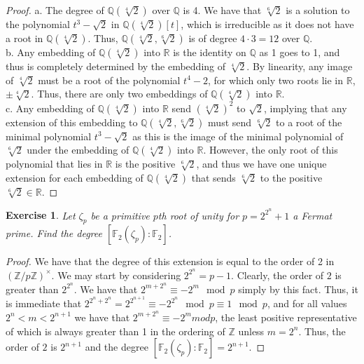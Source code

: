 \documentclass{article}
\newtheorem{exercise}{Exercise}
\begin{document}
\begin{proof}
  a. The degree of $\mathbb{Q}(\sqrt[4]{2})$ over $\mathbb{Q}$ is 4. We have that $\sqrt[6]{2}$ is a solution to the polynomial $t^{3} - \sqrt{2}$ in $\mathbb{Q}(\sqrt[4]{2})[t]$, which is irreducible as it does not have a root in $\mathbb{Q}(\sqrt[4]{2})$. Thus, $\mathbb{Q}(\sqrt[4]{2}, \sqrt[6]{2})$ is of degree $4 \cdot 3 = 12$ over $\mathbb{Q}$. \\
  b. Any embedding of $\mathbb{Q}(\sqrt[4]{2})$ into $\mathbb{R}$ is the identity on $\mathbb{Q}$ as 1 goes to 1, and thus is completely determined by the embedding of $\sqrt[4]{2}$. By linearity, any image of $\sqrt[4]{2}$ must be a root of the polynomial $t^{4} - 2$, for which only two roots lie in $\mathbb{R}$, $\pm \sqrt[4]{2}$. Thus, there are only two embeddings of $\mathbb{Q}(\sqrt[4]{2})$ into $\mathbb{R}$. \\
c. Any embedding of $\mathbb{Q}(\sqrt[4]{2})$ into $\mathbb{R}$ send $(\sqrt[4]{2})^{2}$ to $\sqrt{2}$, implying that any extension of this embedding to $\mathbb{Q}(\sqrt[4]{2}, \sqrt[6]{2})$ must send $\sqrt[6]{2}$ to a root of the minimal polynomial $t^{3} - \sqrt{2}$ as this is the image of the minimal polynomial of $\sqrt[6]{2}$ under the embedding of $\mathbb{Q}(\sqrt[4]{2})$ into $\mathbb{R}$. However, the only root of this polynomial that lies in $\mathbb{R}$ is the positive $\sqrt[6]{2}$, and thus we have one unique extension for each embedding of $\mathbb{Q}(\sqrt[4]{2})$ that sends $\sqrt[6]{2}$ to the positive $\sqrt[6]{2}\in \mathbb{R}$. 
\end{proof}

\begin{exercise}
  Let $\zeta_{p}$ be a primitive $p$th root of unity for $p = 2^{2^{n}}+1$ a Fermat prime. Find the degree $[\mathbb{F}_{2}(\zeta_{p}):\mathbb{F}_{2}]$.
\end{exercise}

\begin{proof}
  We have that the degree of this extension is equal to the order of 2 in $(\mathbb{Z}/p\mathbb{Z})^{\times}$. We may start by considering $2^{2^{n}} = p-1$. Clearly, the order of $2$ is greater than $2^{2^{n}}$. We have that $2^{m+2^{n}}\equiv -2^{m} \mod p$ simply by this fact. Thus, it is immediate that $2^{2^{n}+2^{n}} = 2^{2^{n+1}} \equiv -2^{2^{n}} \mod p \equiv 1 \mod p$, and for all values $2^{n}< m <2^{n+1}$ we have that $2^{m+2^{n}} \equiv -2^{m} mod p$, the least positive representative of which is always greater than 1 in the ordering of $\mathbb{Z}$ unless $m = 2^{n}$. Thus, the order of $2$ is $2^{n+1}$ and the degree $[\mathbb{F}_{2}(\zeta_{p}): \mathbb{F}_{2}] = 2^{n+1}$. 
\end{proof}
\end{document}

